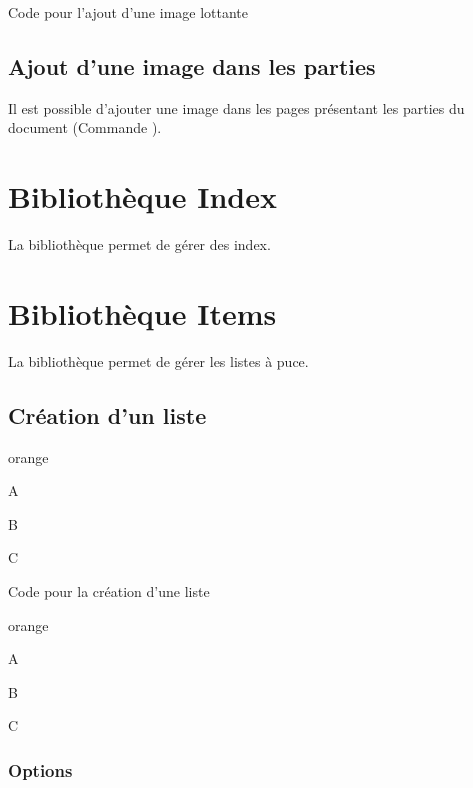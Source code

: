 {
\begin{Latex}{Code pour l'ajout d'une image lottante}
\end{Latex}


\section{Ajout d'une image dans les parties}

Il est possible d'ajouter une image dans les pages présentant les parties du document (Commande ).



\chapter{Bibliothèque Index} \label{index}


La bibliothèque  permet de gérer des index.

\chapter{Bibliothèque Items} \label{Items}

La bibliothèque  permet de gérer les listes à puce.

\section{Création d'un liste}

\begin{items}{orange}{\Triangle}
    \item A
    \item B
    \item C
\end{items}

\begin{Latex}{Code pour la création d'une liste}
\begin{items}{orange}{\Triangle}
    \item A
    \item B
    \item C
\end{items}
\end{Latex}


\subsection{Options}

}
